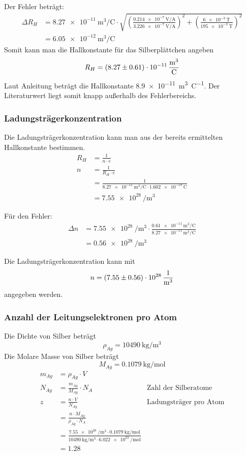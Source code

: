 Der Fehler beträgt:
\begin{align*}
\Delta R_H &= \SI{8.27e-11}{\cubic\meter\per\coulomb} \cdot \sqrt{\left(\frac{\SI{0.214e-7}{\volt\per\ampere}}{\SI{3.226e-7}{\volt\per\ampere}}\right)^2 + \left(\frac{\SI{6e-3}{\tesla}}{\SI{195e-3}{\tesla}}\right)^2} \\
&= \SI{6.05e-12}{\cubic\meter\per\coulomb}
\end{align*}
Somit kann man die Hallkonstante für das Silberplättchen angeben
$$R_H = \SI{8.27 \pm 0.61e-11}{\cubic\meter\per\coulomb}$$
Laut Anleitung beträgt die Hallkonstante \SI{8.9e-11}{\cubic\meter\per\coulomb}.
Der Literaturwert liegt somit knapp außerhalb des Fehlerbereichs.

\subsubsection{Ladungsträgerkonzentration}
Die Ladungsträgerkonzentration kann man aus der bereits ermittelten Hallkonstante bestimmen.
\begin{align*}
R_H &= \frac{1}{n \cdot e} \\
n &= \frac{1}{R_H \cdot e} \\
  &= \frac{1}{\SI{8.27e-11}{\cubic\meter\per\coulomb} \cdot \SI{1.602e-19}{\coulomb}} \\
  &= \SI{7.55e28}{\per\cubic\meter}
\end{align*}

Für den Fehler:
\begin{align*}
\Delta n &= \SI{7.55e28}{\per\cubic\meter} \cdot \frac{\SI{0.61e-11}{\cubic\meter\per\coulomb}}{\SI{8.27e-11}{\cubic\meter\per\coulomb}} \\
&= \SI{0.56e28}{\per\cubic\meter}
\end{align*}

Die Ladungsträgerkonzentration kann mit
$$n = \SI{7.55 \pm 0.56e28}{\per\cubic\meter}$$
angegeben werden.

\subsubsection{Anzahl der Leitungselektronen pro Atom}
Die Dichte von Silber beträgt
$$\rho_{Ag} = \SI{10490}{\kilo\gram\per\cubic\meter}$$
Die Molare Masse von Silber beträgt
$$M_{Ag} = \SI{0.1079}{\kilo\gram\per\mole}$$
\begin{align*}
m_{Ag} &= \rho_{Ag} \cdot V \\
N_{Ag} &= \frac{m_{Ag}}{M_{Ag}} \cdot N_A & \text{Zahl der Silberatome}\\
z &= \frac{n \cdot V}{N_{Ag}} & \text{Ladungsträger pro Atom}\\
  &= \frac{n \cdot M_{Ag}}{\rho_{Ag} \cdot N_A} \\
  &= \frac{\SI{7.55e28}{\per\cubic\meter} \cdot \SI{0.1079}{\kilo\gram\per\mole}}{\SI{10490}{\kilo\gram\per\cubic\meter} \cdot \SI{6.022e23}{\per\mole}} \\
  &= 1.28
\end{align*}

